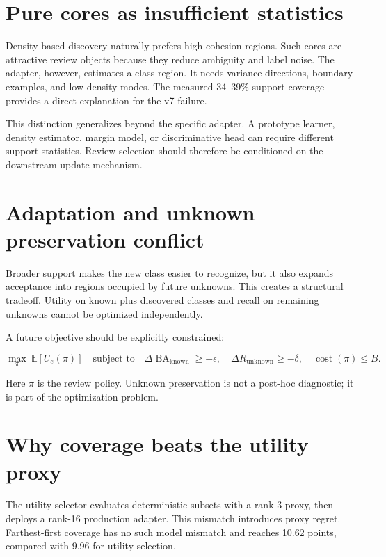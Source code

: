 \documentclass[12pt,oneside]{report}
\newcommand{\ba}{\operatorname{BA}}
\newcommand{\utility}{U}
\begin{document}
\section{Pure cores as insufficient statistics}

Density-based discovery naturally prefers high-cohesion regions. Such cores
are attractive review objects because they reduce ambiguity and label noise.
The adapter, however, estimates a class region. It needs variance directions,
boundary examples, and low-density modes. The measured 34--39\% support
coverage provides a direct explanation for the v7 failure.

This distinction generalizes beyond the specific adapter. A prototype learner,
density estimator, margin model, or discriminative head can require different
support statistics. Review selection should therefore be conditioned on the
downstream update mechanism.

\section{Adaptation and unknown preservation conflict}

Broader support makes the new class easier to recognize, but it also expands
acceptance into regions occupied by future unknowns. This creates a structural
tradeoff. Utility on known plus discovered classes and recall on remaining
unknowns cannot be optimized independently.

A future objective should be explicitly constrained:

\begin{equation}
\max_{\pi}\ \mathbb{E}[\utility_e(\pi)]
\quad\text{subject to}\quad
\Delta\ba_{\text{known}}\geq-\epsilon,\quad
\Delta R_{\text{unknown}}\geq-\delta,\quad
\operatorname{cost}(\pi)\leq B.
\end{equation}

Here $\pi$ is the review policy. Unknown preservation is not a post-hoc
diagnostic; it is part of the optimization problem.

\section{Why coverage beats the utility proxy}

The utility selector evaluates deterministic subsets with a rank-3 proxy, then
deploys a rank-16 production adapter. This mismatch introduces proxy regret.
Farthest-first coverage has no such model mismatch and reaches 10.62 points,
compared with 9.96 for utility selection.
\end{document}
